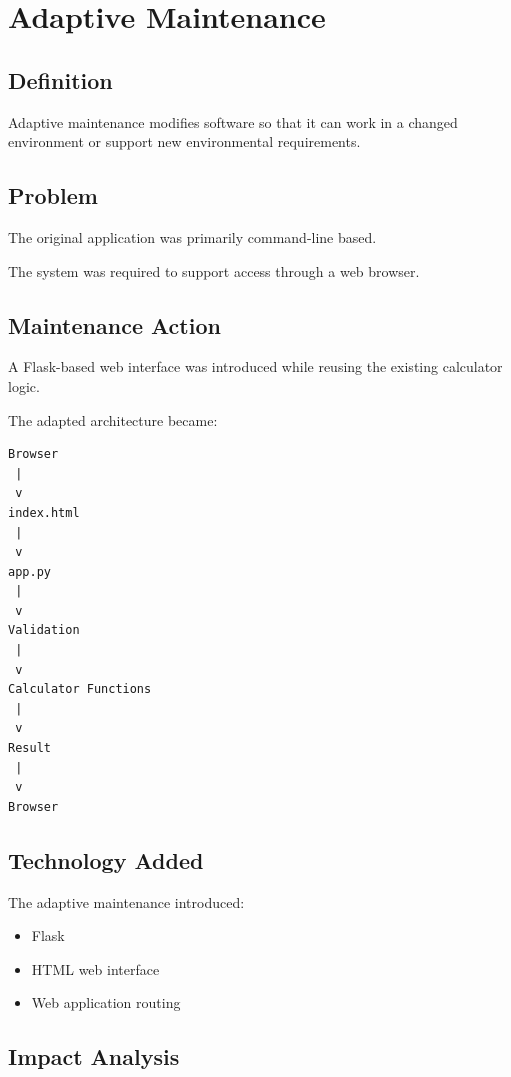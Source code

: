 \documentclass[12pt,a4paper]{report}
\begin{document}
\chapter{Adaptive Maintenance}

\section{Definition}

Adaptive maintenance modifies software so that it can work in a
changed environment or support new environmental requirements.

\section{Problem}

The original application was primarily command-line based.

The system was required to support access through a web browser.

\section{Maintenance Action}

A Flask-based web interface was introduced while reusing the existing
calculator logic.

The adapted architecture became:

\begin{lstlisting}
Browser
 |
 v
index.html
 |
 v
app.py
 |
 v
Validation
 |
 v
Calculator Functions
 |
 v
Result
 |
 v
Browser
\end{lstlisting}

\section{Technology Added}

The adaptive maintenance introduced:

\begin{itemize}
    \item Flask
    \item HTML web interface
    \item Web application routing
\end{itemize}

\section{Impact Analysis}
\end{document}
